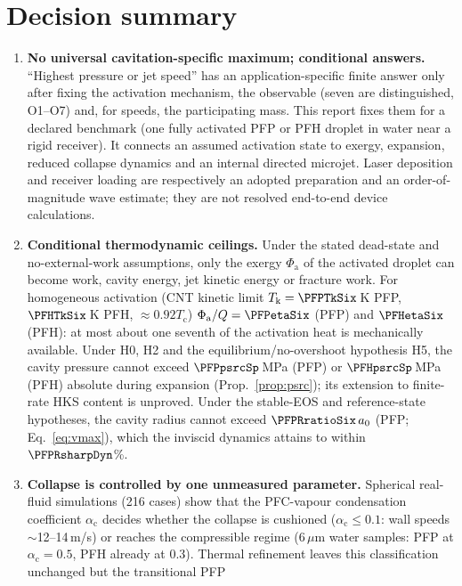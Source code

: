 \section*{Decision summary}
\begin{enumerate}[leftmargin=*,itemsep=2pt]
\item \textbf{No universal cavitation-specific maximum; conditional answers.} ``Highest pressure or jet speed'' has
an application-specific finite answer only after fixing the activation mechanism, the observable (seven are distinguished, O1--O7) and,
for speeds, the participating mass. This report fixes them for a declared benchmark (one fully activated
PFP or PFH droplet in water near a rigid receiver). It connects an assumed activation state to
exergy, expansion, reduced collapse dynamics and an internal directed microjet. Laser deposition
and receiver loading are respectively an adopted preparation and an order-of-magnitude wave estimate;
they are not resolved end-to-end device calculations.
\item \textbf{Conditional thermodynamic ceilings.} Under the stated dead-state and no-external-work
assumptions, only the exergy $\Phi_{\mathrm a}$ of the
activated droplet can become work, cavity energy, jet kinetic energy or fracture work. For homogeneous
activation (CNT kinetic limit $T_{\mathrm k}=\PFPTkSix$\,K PFP, $\PFHTkSix$\,K PFH, $\approx0.92T_{\mathrm c}$)
$\Phi_{\mathrm a}/Q=\PFPetaSix$ (PFP) and $\PFHetaSix$ (PFH): at most about one seventh of the activation heat is
mechanically available. Under H0, H2 and the equilibrium/no-overshoot hypothesis H5, the cavity
pressure cannot exceed $\PFPpsrcSp$\,MPa (PFP) or $\PFHpsrcSp$\,MPa (PFH) absolute during expansion
(Prop.~\ref{prop:psrc}); its extension to finite-rate HKS content is unproved. Under the stable-EOS
and reference-state hypotheses, the cavity radius cannot exceed $\PFPRratioSix\,a_0$ (PFP; Eq.~\ref{eq:vmax}),
which the inviscid dynamics attains to within $\PFPRsharpDyn$\%.
\item \textbf{Collapse is controlled by one unmeasured parameter.} Spherical real-fluid simulations (216 cases) show
that the PFC-vapour condensation coefficient $\alpha_{\mathrm c}$ decides whether the collapse is cushioned
($\alpha_{\mathrm c}\le0.1$: wall speeds $\sim$12--14\,m/s) or reaches the compressible regime
(6\,$\mu$m water samples: PFP at $\alpha_{\mathrm c}=0.5$, PFH already at $0.3$).
Thermal refinement leaves this classification unchanged but the transitional PFP

\end{enumerate}
